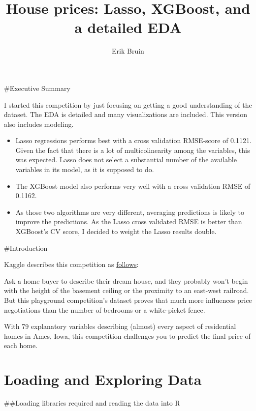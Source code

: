 \documentclass[]{article}
\title{House prices: Lasso, XGBoost, and a detailed EDA}
\author{Erik Bruin}
\date{}
\providecommand{\tightlist}{%
  \setlength{\itemsep}{0pt}\setlength{\parskip}{0pt}}
\begin{document}
\maketitle

{
\setcounter{tocdepth}{3}
\tableofcontents
}
\#Executive Summary

I started this competition by just focusing on getting a good
understanding of the dataset. The EDA is detailed and many
visualizations are included. This version also includes modeling.

\begin{itemize}
\tightlist
\item
  Lasso regressions performs best with a cross validation RMSE-score of
  0.1121. Given the fact that there is a lot of multicolinearity among
  the variables, this was expected. Lasso does not select a substantial
  number of the available variables in its model, as it is supposed to
  do.
\item
  The XGBoost model also performs very well with a cross validation RMSE
  of 0.1162.
\item
  As those two algorithms are very different, averaging predictions is
  likely to improve the predictions. As the Lasso cross validated RMSE
  is better than XGBoost's CV score, I decided to weight the Lasso
  results double.
\end{itemize}

\#Introduction

Kaggle describes this competition as
\href{https://www.kaggle.com/c/house-prices-advanced-regression-techniques}{follows}:

Ask a home buyer to describe their dream house, and they probably won't
begin with the height of the basement ceiling or the proximity to an
east-west railroad. But this playground competition's dataset proves
that much more influences price negotiations than the number of bedrooms
or a white-picket fence.

With 79 explanatory variables describing (almost) every aspect of
residential homes in Ames, Iowa, this competition challenges you to
predict the final price of each home.

\hypertarget{loading-and-exploring-data}{%
\section{Loading and Exploring Data}\label{loading-and-exploring-data}}

\#\#Loading libraries required and reading the data into R
\end{document}
